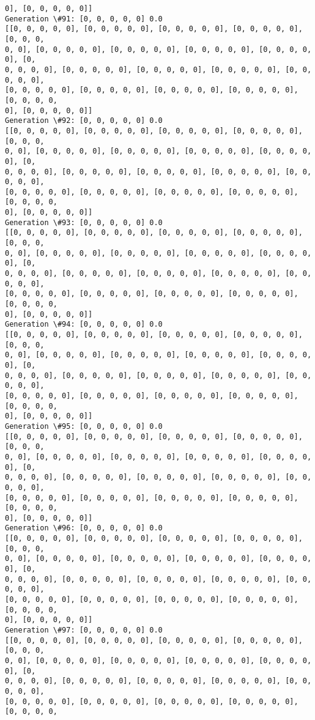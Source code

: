 \documentclass[11pt]{article}
\begin{document}
\begin{Verbatim}[commandchars=\\\{\}]
0], [0, 0, 0, 0, 0]]
Generation \#91: [0, 0, 0, 0, 0] 0.0
[[0, 0, 0, 0, 0], [0, 0, 0, 0, 0], [0, 0, 0, 0, 0], [0, 0, 0, 0, 0], [0, 0, 0,
0, 0], [0, 0, 0, 0, 0], [0, 0, 0, 0, 0], [0, 0, 0, 0, 0], [0, 0, 0, 0, 0], [0,
0, 0, 0, 0], [0, 0, 0, 0, 0], [0, 0, 0, 0, 0], [0, 0, 0, 0, 0], [0, 0, 0, 0, 0],
[0, 0, 0, 0, 0], [0, 0, 0, 0, 0], [0, 0, 0, 0, 0], [0, 0, 0, 0, 0], [0, 0, 0, 0,
0], [0, 0, 0, 0, 0]]
Generation \#92: [0, 0, 0, 0, 0] 0.0
[[0, 0, 0, 0, 0], [0, 0, 0, 0, 0], [0, 0, 0, 0, 0], [0, 0, 0, 0, 0], [0, 0, 0,
0, 0], [0, 0, 0, 0, 0], [0, 0, 0, 0, 0], [0, 0, 0, 0, 0], [0, 0, 0, 0, 0], [0,
0, 0, 0, 0], [0, 0, 0, 0, 0], [0, 0, 0, 0, 0], [0, 0, 0, 0, 0], [0, 0, 0, 0, 0],
[0, 0, 0, 0, 0], [0, 0, 0, 0, 0], [0, 0, 0, 0, 0], [0, 0, 0, 0, 0], [0, 0, 0, 0,
0], [0, 0, 0, 0, 0]]
Generation \#93: [0, 0, 0, 0, 0] 0.0
[[0, 0, 0, 0, 0], [0, 0, 0, 0, 0], [0, 0, 0, 0, 0], [0, 0, 0, 0, 0], [0, 0, 0,
0, 0], [0, 0, 0, 0, 0], [0, 0, 0, 0, 0], [0, 0, 0, 0, 0], [0, 0, 0, 0, 0], [0,
0, 0, 0, 0], [0, 0, 0, 0, 0], [0, 0, 0, 0, 0], [0, 0, 0, 0, 0], [0, 0, 0, 0, 0],
[0, 0, 0, 0, 0], [0, 0, 0, 0, 0], [0, 0, 0, 0, 0], [0, 0, 0, 0, 0], [0, 0, 0, 0,
0], [0, 0, 0, 0, 0]]
Generation \#94: [0, 0, 0, 0, 0] 0.0
[[0, 0, 0, 0, 0], [0, 0, 0, 0, 0], [0, 0, 0, 0, 0], [0, 0, 0, 0, 0], [0, 0, 0,
0, 0], [0, 0, 0, 0, 0], [0, 0, 0, 0, 0], [0, 0, 0, 0, 0], [0, 0, 0, 0, 0], [0,
0, 0, 0, 0], [0, 0, 0, 0, 0], [0, 0, 0, 0, 0], [0, 0, 0, 0, 0], [0, 0, 0, 0, 0],
[0, 0, 0, 0, 0], [0, 0, 0, 0, 0], [0, 0, 0, 0, 0], [0, 0, 0, 0, 0], [0, 0, 0, 0,
0], [0, 0, 0, 0, 0]]
Generation \#95: [0, 0, 0, 0, 0] 0.0
[[0, 0, 0, 0, 0], [0, 0, 0, 0, 0], [0, 0, 0, 0, 0], [0, 0, 0, 0, 0], [0, 0, 0,
0, 0], [0, 0, 0, 0, 0], [0, 0, 0, 0, 0], [0, 0, 0, 0, 0], [0, 0, 0, 0, 0], [0,
0, 0, 0, 0], [0, 0, 0, 0, 0], [0, 0, 0, 0, 0], [0, 0, 0, 0, 0], [0, 0, 0, 0, 0],
[0, 0, 0, 0, 0], [0, 0, 0, 0, 0], [0, 0, 0, 0, 0], [0, 0, 0, 0, 0], [0, 0, 0, 0,
0], [0, 0, 0, 0, 0]]
Generation \#96: [0, 0, 0, 0, 0] 0.0
[[0, 0, 0, 0, 0], [0, 0, 0, 0, 0], [0, 0, 0, 0, 0], [0, 0, 0, 0, 0], [0, 0, 0,
0, 0], [0, 0, 0, 0, 0], [0, 0, 0, 0, 0], [0, 0, 0, 0, 0], [0, 0, 0, 0, 0], [0,
0, 0, 0, 0], [0, 0, 0, 0, 0], [0, 0, 0, 0, 0], [0, 0, 0, 0, 0], [0, 0, 0, 0, 0],
[0, 0, 0, 0, 0], [0, 0, 0, 0, 0], [0, 0, 0, 0, 0], [0, 0, 0, 0, 0], [0, 0, 0, 0,
0], [0, 0, 0, 0, 0]]
Generation \#97: [0, 0, 0, 0, 0] 0.0
[[0, 0, 0, 0, 0], [0, 0, 0, 0, 0], [0, 0, 0, 0, 0], [0, 0, 0, 0, 0], [0, 0, 0,
0, 0], [0, 0, 0, 0, 0], [0, 0, 0, 0, 0], [0, 0, 0, 0, 0], [0, 0, 0, 0, 0], [0,
0, 0, 0, 0], [0, 0, 0, 0, 0], [0, 0, 0, 0, 0], [0, 0, 0, 0, 0], [0, 0, 0, 0, 0],
[0, 0, 0, 0, 0], [0, 0, 0, 0, 0], [0, 0, 0, 0, 0], [0, 0, 0, 0, 0], [0, 0, 0, 0,

\end{Verbatim}
\end{document}
